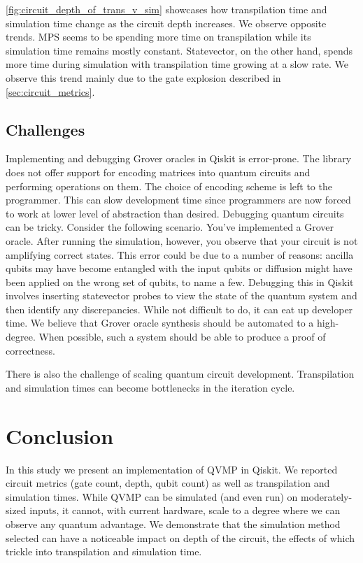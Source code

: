 \documentclass[11pt]{article}
\theoremstyle{definition}
\theoremstyle{remark}
\begin{document}
\cref{fig:circuit_depth_of_trans_v_sim} showcases how transpilation
time and simulation time change as the circuit depth increases. We observe
opposite trends. MPS seems to be spending more time on transpilation while its
simulation time remains mostly constant. Statevector, on the other hand,
spends more time during simulation with transpilation time growing at a slow
rate. We observe this trend mainly due to the gate explosion described in
\cref{sec:circuit_metrics}.

\subsection{Challenges}

Implementing and debugging Grover oracles in Qiskit is error-prone. The library
does not offer support for encoding matrices into quantum circuits and
performing operations on them.  The choice of encoding scheme is left to the
programmer. This can slow development time since programmers are now forced to
work at lower level of abstraction than desired. Debugging quantum circuits can
be tricky. Consider the following scenario. You've implemented a Grover oracle.
After running the simulation, however, you observe that your circuit is not
amplifying correct states. This error could be due to a number of reasons:
ancilla qubits may have become entangled with the input qubits or diffusion
might have been applied on the wrong set of qubits, to name a few. Debugging
this in Qiskit involves inserting statevector probes to view the state of the
quantum system and then identify any discrepancies.  While not difficult to do,
it can eat up developer time. We believe that Grover oracle synthesis should be
automated to a high-degree. When possible, such a system should be able to
produce a proof of correctness.

There is also the challenge of scaling quantum circuit development.
Transpilation and simulation times can become bottlenecks in the iteration
cycle.

\section{Conclusion}

In this study we present an implementation of QVMP in Qiskit. We reported
circuit metrics (gate count, depth, qubit count) as well as transpilation and
simulation times. While QVMP can be simulated (and even run) on moderately-sized
inputs, it cannot, with current hardware, scale to a degree where we can
observe any quantum advantage. We demonstrate that the simulation method
selected can have a noticeable impact on depth of the circuit, the effects of
which trickle into transpilation and simulation time.
\end{document}
